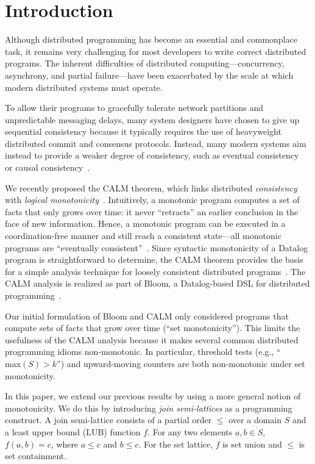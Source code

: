 \section{Introduction}
\label{sec:intro}
Although distributed programming has become an essential and commonplace task,
it remains very challenging for most developers to write correct distributed
programs. The inherent difficulties of distributed computing---concurrency,
asynchrony, and partial failure---have been exacerbated by the scale at which
modern distributed systems must operate.

To allow their programs to gracefully tolerate network partitions and
unpredictable messaging delays, many system designers have chosen to give up
sequential consistency because it typically requires the use of heavyweight
distributed commit and consensus protocols. Instead, many modern systems aim
instead to provide a weaker degree of consistency, such as eventual
consistency~\cite{Terry1995} or causal consistency~\cite{Lloyd2011}.

We recently proposed the CALM theorem, which links distributed
\emph{consistency} with \emph{logical
  monotonicity}~\cite{Alvaro2011,Hellerstein2010}. Intuitively, a monotonic
program computes a set of facts that only grows over time: it never ``retracts''
an earlier conclusion in the face of new information. Hence, a monotonic program
can be executed in a coordination-free manner and still reach a consistent
state---all monotonic programs are ``eventually
consistent''~\cite{Ameloot2011}. Since syntactic monotonicity of a Datalog
program is straightforward to determine, the CALM theorem provides the basis for
a simple analysis technique for loosely consistent distributed
programs~\cite{Alvaro2011}. The CALM analysis is realized as part of Bloom, a
Datalog-based DSL for distributed programming~\cite{bloom}.

Our initial formulation of Bloom and CALM only considered programs that compute
sets of facts that grow over time (``set monotonicity''). This limits the
usefulness of the CALM analysis because it makes several common distributed
programming idioms non-monotonic. In particular, threshold tests (e.g.,
``$\textrm{max}(S) > k$'') and upward-moving counters are both non-monotonic
under set monotonicity.

In this paper, we extend our previous results by using a more general notion of
monotonicity. We do this by introducing \emph{join semi-lattices} as a
programming construct. A join semi-lattice consists of a partial order $\le$
over a domain $S$ and a least upper bound (LUB) function $f$. For any two
elements $a,b \in S$, $f(a, b) = c$, where $a \le c$ and $b \le c$. For the set
lattice, $f$ is set union and $\le$ is set containment.

